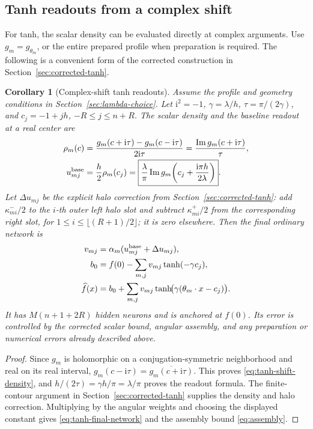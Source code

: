 \documentclass[11pt,letterpaper]{article}
\newcommand{\ii}{\mathrm i}
\newtheorem{corollary}[lemma]{Corollary}
\theoremstyle{definition}
\theoremstyle{remark}
\begin{document}
\subsection{Tanh readouts from a complex shift}\label{sec:tanh-readouts}
For tanh, the scalar density can be evaluated directly at complex arguments.
Use \(g_m=g_{\theta_m}\), or the entire prepared profile when preparation
is required. The following is a convenient form of the corrected construction
in Section~\ref{sec:corrected-tanh}.

\begin{corollary}[Complex-shift tanh readouts]\label{cor:tanh-shift}
Assume the profile and geometry conditions in
Section~\ref{sec:lambda-choice}. Let \(\ii^2=-1\),
\(\gamma=\lambda/h\), \(\tau=\pi/(2\gamma)\), and
\(c_j=-1+jh\), \(-R\le j\le n+R\).
The scalar density and the baseline readout at a real center are
\begin{align}
 \rho_m(c)
 &=\frac{g_m(c+\ii\tau)-g_m(c-\ii\tau)}{2\ii\tau}
   =\frac{\operatorname{Im}g_m(c+\ii\tau)}{\tau},\label{eq:tanh-shift-density}\\
 u^{\rm base}_{mj}
 &=\frac h2\rho_m(c_j)
   =\boxed{\frac{\lambda}{\pi}\operatorname{Im}
      g_m\!\left(c_j+\frac{\ii\pi h}{2\lambda}\right)}.
      \label{eq:tanh-shift-weight}
\end{align}
Let \(\Delta u_{mj}\) be the explicit halo correction from
Section~\ref{sec:corrected-tanh}: add \(\kappa^-_{mi}/2\) to the \(i\)-th
outer left halo slot and subtract \(\kappa^+_{mi}/2\) from the corresponding
right slot, for \(1\le i\le\lfloor(R+1)/2\rfloor\); it is zero elsewhere.
Then the final ordinary network is
\begin{align}
 v_{mj}&=\alpha_m(u^{\rm base}_{mj}+\Delta u_{mj}),\nonumber\\
 b_0&=f(0)-\sum_{m,j}v_{mj}\tanh(-\gamma c_j),\nonumber\\
 \widehat f(x)&=b_0+\sum_{m,j}v_{mj}
                  \tanh\!\bigl(\gamma(\theta_m\cdot x-c_j)\bigr).
                  \label{eq:tanh-final-network}
\end{align}
It has \(M(n+1+2R)\) hidden neurons and is anchored at \(f(0)\).
Its error is controlled by the corrected scalar bound, angular assembly,
and any preparation or numerical errors already described above.
\end{corollary}
\begin{proof}
Since \(g_m\) is holomorphic on a conjugation-symmetric neighborhood and real
on its real interval, \(g_m(c-\ii\tau)=\overline{g_m(c+\ii\tau)}\).
This proves \eqref{eq:tanh-shift-density}, and
\(h/(2\tau)=\gamma h/\pi=\lambda/\pi\) proves the readout formula.
The finite-contour argument in Section~\ref{sec:corrected-tanh} supplies
the density and halo correction. Multiplying by the angular weights and
choosing the displayed constant gives \eqref{eq:tanh-final-network} and
the assembly bound \eqref{eq:assembly}.
\end{proof}
\end{document}
